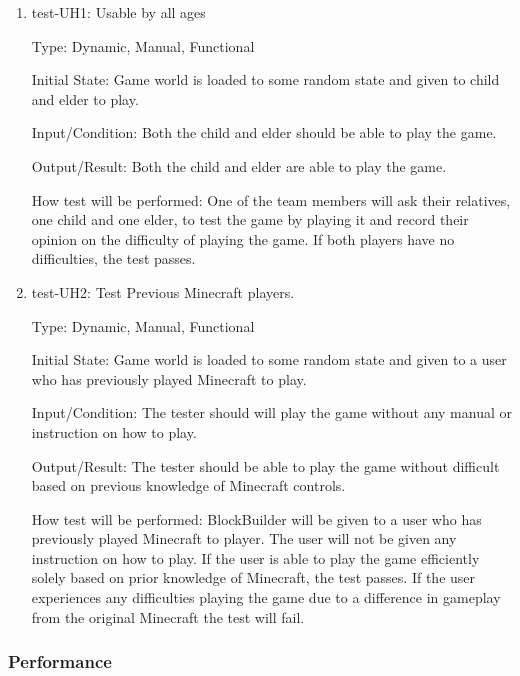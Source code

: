 \documentclass[12pt, titlepage]{article}
\begin{document}
\begin{enumerate}

\item{test-UH1: Usable by all ages\\}

Type: Dynamic, Manual, Functional
					
Initial State: Game world is loaded to some random state and given to child and elder to play.
					
Input/Condition: Both the child and elder should be able to play the game.
					
Output/Result: Both the child and elder are able to play the game.
					
How test will be performed: One of the team members will ask their relatives, one child and one elder, to test the game by playing it and record their opinion on the difficulty of playing the game. If both players have no difficulties, the test passes.

\item{test-UH2: Test Previous Minecraft players.\\}

Type: Dynamic, Manual, Functional
					
Initial State: Game world is loaded to some random state and given to a user who has previously played Minecraft to play.
					
Input/Condition: The tester should will play the game without any manual or instruction on how to play.
					
Output/Result: The tester should be able to play the game without difficult based on previous knowledge of Minecraft controls.
					
How test will be performed: BlockBuilder will be given to a user who has previously played Minecraft to player. The user will not be given any instruction on how to play. If the user is able to play the game efficiently solely based on prior knowledge of Minecraft, the test passes. If the user experiences any difficulties playing the game due to a difference in gameplay from the original Minecraft the test will fail.

\end{enumerate}

\subsubsection{Performance}
\end{document}
